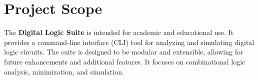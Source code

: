 \section{Project Scope}
The \textbf{Digital Logic Suite} is intended for academic and educational use. It provides a command-line interface (CLI) tool for analyzing and simulating digital logic circuits. The suite is designed to be modular and extensible, allowing for future enhancements and additional features. It focuses on combinational logic analysis, minimization, and simulation.
